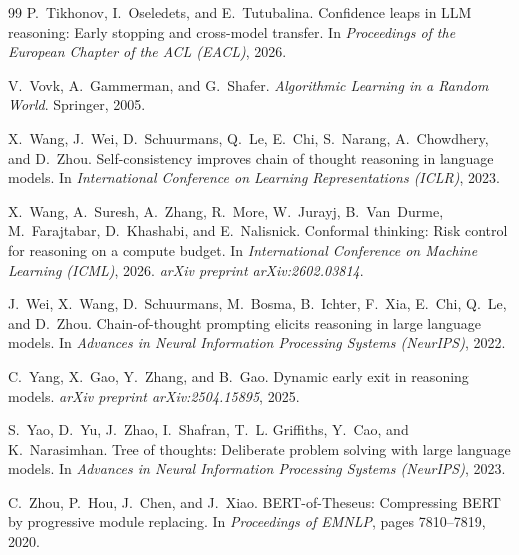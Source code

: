 \documentclass[11pt]{article}
\begin{document}
\begin{thebibliography}{99}
P.~Tikhonov, I.~Oseledets, and E.~Tutubalina.
\newblock Confidence leaps in LLM reasoning: Early stopping and cross-model transfer.
\newblock In \emph{Proceedings of the European Chapter of the ACL (EACL)}, 2026.

V.~Vovk, A.~Gammerman, and G.~Shafer.
\newblock \emph{Algorithmic Learning in a Random World}.
\newblock Springer, 2005.

X.~Wang, J.~Wei, D.~Schuurmans, Q.~Le, E.~Chi, S.~Narang, A.~Chowdhery, and D.~Zhou.
\newblock Self-consistency improves chain of thought reasoning in language models.
\newblock In \emph{International Conference on Learning Representations (ICLR)}, 2023.

X.~Wang, A.~Suresh, A.~Zhang, R.~More, W.~Jurayj, B.~Van~Durme, M.~Farajtabar, D.~Khashabi, and E.~Nalisnick.
\newblock Conformal thinking: Risk control for reasoning on a compute budget.
\newblock In \emph{International Conference on Machine Learning (ICML)}, 2026.
\newblock \emph{arXiv preprint arXiv:2602.03814}.

J.~Wei, X.~Wang, D.~Schuurmans, M.~Bosma, B.~Ichter, F.~Xia, E.~Chi, Q.~Le, and D.~Zhou.
\newblock Chain-of-thought prompting elicits reasoning in large language models.
\newblock In \emph{Advances in Neural Information Processing Systems (NeurIPS)}, 2022.

C.~Yang, X.~Gao, Y.~Zhang, and B.~Gao.
\newblock Dynamic early exit in reasoning models.
\newblock \emph{arXiv preprint arXiv:2504.15895}, 2025.

S.~Yao, D.~Yu, J.~Zhao, I.~Shafran, T.~L. Griffiths, Y.~Cao, and K.~Narasimhan.
\newblock Tree of thoughts: Deliberate problem solving with large language models.
\newblock In \emph{Advances in Neural Information Processing Systems (NeurIPS)}, 2023.

C.~Zhou, P.~Hou, J.~Chen, and J.~Xiao.
\newblock BERT-of-Theseus: Compressing BERT by progressive module replacing.
\newblock In \emph{Proceedings of EMNLP}, pages 7810--7819, 2020.

\end{thebibliography}
\end{document}
